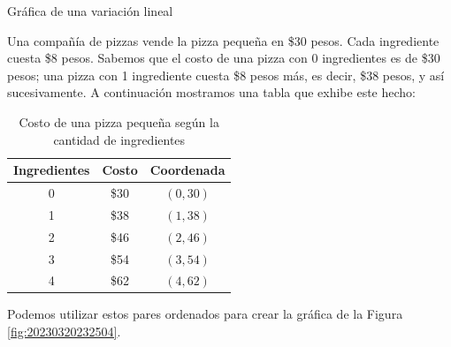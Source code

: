 \begin{infocard}{Gráfica de una variación lineal}
    \begin{minipage}[t]{0.8\textwidth}
        Una compañía de pizzas vende la pizza pequeña en \$30 pesos. Cada ingrediente cuesta \$8 pesos.
        Sabemos que el costo de una pizza con 0 ingredientes es de \$30 pesos; una pizza con 1 ingrediente cuesta \$8 pesos más,
        es decir, \$38 pesos, y así sucesivamente. A continuación mostramos una tabla que exhibe este hecho:

        \begin{table}[H]
            \centering
            \caption{Costo de una pizza pequeña según la cantidad de ingredientes}
            \label{tab:pizza_ingredientes}
            \begin{tabular}{|c|c|c|}
                \toprule
                \rowcolor{colorrds!80}
                \textbf{\color{white}Ingredientes} & \textbf{\color{white}Costo} & \textbf{\color{white}Coordenada} \\\midrule
                0                                  & \$30                        & $(0,30)$                         \\\hline
                1                                  & \$38                        & $(1,38)$                         \\\hline
                2                                  & \$46                        & $(2,46)$                         \\\hline
                3                                  & \$54                        & $(3,54)$                         \\\hline
                4                                  & \$62                        & $(4,62)$                         \\\hline
                \bottomrule
            \end{tabular}
        \end{table}
        Podemos utilizar estos pares ordenados para crear la gráfica de la Figura \ref{fig:20230320232504}.
    \end{minipage}\hfill
    \begin{minipage}[t]{0.2\textwidth}
        \begin{figure}[H]
            \centering

\end{figure}
\end{minipage}
\end{infocard}
